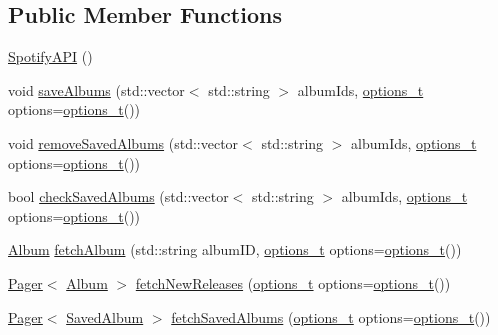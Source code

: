 \subsection*{Public Member Functions}
\begin{DoxyCompactItemize}
\item 
\mbox{\hyperlink{class_spotify_a_p_i_ab0d1896e2ab4c52f496eb494640a89b1}{Spotify\+A\+PI}} ()
\item 
void \mbox{\hyperlink{class_spotify_a_p_i_abcf8490d7729c7c620fbdc42faf94c3a}{save\+Albums}} (std\+::vector$<$ std\+::string $>$ album\+Ids, \mbox{\hyperlink{_spotify_a_p_i_8h_a0ff5cac1a4007bb330b7d9939650c283}{options\+\_\+t}} options=\mbox{\hyperlink{_spotify_a_p_i_8h_a0ff5cac1a4007bb330b7d9939650c283}{options\+\_\+t}}())
\item 
void \mbox{\hyperlink{class_spotify_a_p_i_ac17d1f6b822fcdf9c6ab6153ae8df6c3}{remove\+Saved\+Albums}} (std\+::vector$<$ std\+::string $>$ album\+Ids, \mbox{\hyperlink{_spotify_a_p_i_8h_a0ff5cac1a4007bb330b7d9939650c283}{options\+\_\+t}} options=\mbox{\hyperlink{_spotify_a_p_i_8h_a0ff5cac1a4007bb330b7d9939650c283}{options\+\_\+t}}())
\item 
bool \mbox{\hyperlink{class_spotify_a_p_i_a4a32dc278f53d67df8037b9a57b9d776}{check\+Saved\+Albums}} (std\+::vector$<$ std\+::string $>$ album\+Ids, \mbox{\hyperlink{_spotify_a_p_i_8h_a0ff5cac1a4007bb330b7d9939650c283}{options\+\_\+t}} options=\mbox{\hyperlink{_spotify_a_p_i_8h_a0ff5cac1a4007bb330b7d9939650c283}{options\+\_\+t}}())
\item 
\mbox{\hyperlink{class_album}{Album}} \mbox{\hyperlink{class_spotify_a_p_i_aea55f7caebed1664d2c39d1c3c4612ec}{fetch\+Album}} (std\+::string album\+ID, \mbox{\hyperlink{_spotify_a_p_i_8h_a0ff5cac1a4007bb330b7d9939650c283}{options\+\_\+t}} options=\mbox{\hyperlink{_spotify_a_p_i_8h_a0ff5cac1a4007bb330b7d9939650c283}{options\+\_\+t}}())
\item 
\mbox{\hyperlink{class_pager}{Pager}}$<$ \mbox{\hyperlink{class_album}{Album}} $>$ \mbox{\hyperlink{class_spotify_a_p_i_a04e6f0cef6120d389a29a760bb883ee0}{fetch\+New\+Releases}} (\mbox{\hyperlink{_spotify_a_p_i_8h_a0ff5cac1a4007bb330b7d9939650c283}{options\+\_\+t}} options=\mbox{\hyperlink{_spotify_a_p_i_8h_a0ff5cac1a4007bb330b7d9939650c283}{options\+\_\+t}}())
\item 
\mbox{\hyperlink{class_pager}{Pager}}$<$ \mbox{\hyperlink{class_saved_album}{Saved\+Album}} $>$ \mbox{\hyperlink{class_spotify_a_p_i_a3a1c8e4ea736afdb697560b0bd9783ef}{fetch\+Saved\+Albums}} (\mbox{\hyperlink{_spotify_a_p_i_8h_a0ff5cac1a4007bb330b7d9939650c283}{options\+\_\+t}} options=\mbox{\hyperlink{_spotify_a_p_i_8h_a0ff5cac1a4007bb330b7d9939650c283}{options\+\_\+t}}())

\end{DoxyCompactItemize}
